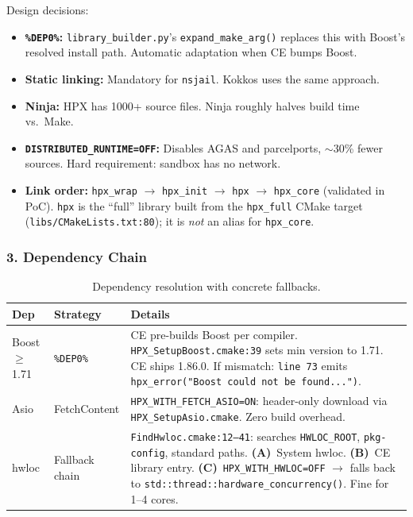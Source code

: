 \documentclass[11pt, a4paper]{article}
\newcommand{\code}[1]{\texttt{#1}}
\newcommand{\cefile}[1]{\texttt{#1}}
\begin{document}
Design decisions:

\begin{itemize}[leftmargin=2em, itemsep=2pt]
  \item \textbf{\code{\%DEP0\%}:} \cefile{library\_builder.py}'s
        \code{expand\_make\_arg()} replaces this with Boost's resolved
        install path.  Automatic adaptation when CE bumps Boost.

  \item \textbf{Static linking:} Mandatory for \code{nsjail}.  Kokkos
        uses the same approach.

  \item \textbf{Ninja:} HPX has 1000+ source files.  Ninja roughly halves
        build time vs.\ Make.

  \item \textbf{\code{DISTRIBUTED\_RUNTIME=OFF}:} Disables AGAS and
        parcelports, $\sim$30\% fewer sources.  Hard requirement:
        sandbox has no network.

  \item \textbf{Link order:} \code{hpx\_wrap} $\to$ \code{hpx\_init} $\to$
        \code{hpx} $\to$ \code{hpx\_core} (validated in PoC).
        \code{hpx} is the ``full'' library built from the \code{hpx\_full}
        CMake target (\cefile{libs/CMakeLists.txt:80}); it is \emph{not} an
        alias for \code{hpx\_core}.
\end{itemize}

\subsubsection*{3. Dependency Chain}

\begin{table}[H]
\centering\small
\begin{tabularx}{\linewidth}{@{}llX@{}}
\toprule
\textbf{Dep} & \textbf{Strategy} & \textbf{Details} \\
\midrule
\rowcolor{rowgray}
Boost $\geq$1.71 & \code{\%DEP0\%} &
  CE pre-builds Boost per compiler.  \cefile{HPX\_SetupBoost.cmake:39}
  sets min version to 1.71.  CE ships 1.86.0.  If mismatch:
  \cefile{line~73} emits \code{hpx\_error("Boost could not be found...")}. \\
Asio & FetchContent &
  \code{HPX\_WITH\_FETCH\_ASIO=ON}: header-only download via
  \cefile{HPX\_SetupAsio.cmake}.  Zero build overhead. \\
\rowcolor{rowgray}
hwloc & Fallback chain &
  \cefile{FindHwloc.cmake:12--41}: searches \code{HWLOC\_ROOT},
  \code{pkg-config}, standard paths.
  \textbf{(A)}~System hwloc.
  \textbf{(B)}~CE library entry.
  \textbf{(C)}~\code{HPX\_WITH\_HWLOC=OFF} $\to$ falls back to
  \code{std::thread::hardware\_concurrency()}.  Fine for 1--4 cores. \\
\bottomrule
\end{tabularx}
\caption{Dependency resolution with concrete fallbacks.}
\end{table}
\end{document}
